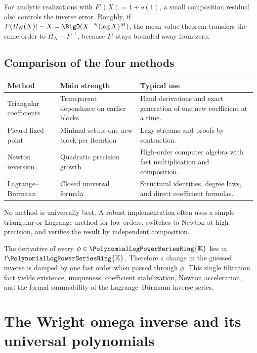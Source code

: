 \documentclass[11pt,oneside,openany]{book}
\newcommand{\K}{\mathbb{K}}
\newcommand{\Rring}{\PolynomialLogPowerSeriesRing{\K}}
\begin{document}
For analytic realizations with \(F'(X)=1+o(1)\), a small composition residual
also controls the inverse error.  Roughly, if
\(F(H_N(X))-X=\BigO(X^{-N}(\log X)^M)\), the mean value theorem transfers the
same order to \(H_N-F^{-1}\), because \(F'\) stays bounded away from zero.

\section{Comparison of the four methods}
\begin{center}
\begin{tabularx}{0.95\textwidth}{@{}>{\raggedright\arraybackslash}p{}>{\raggedright\arraybackslash}p{}X@{}}
\toprule
Method & Main strength & Typical use \\
\midrule
Triangular coefficients
& Transparent dependence on earlier blocks
& Hand derivations and exact generation of one new coefficient at a time. \\
Picard fixed point
& Minimal setup; one new block per iteration
& Lazy streams and proofs by contraction. \\
Newton reversion
& Quadratic precision growth
& High-order computer algebra with fast multiplication and composition. \\
Lagrange--Bürmann
& Closed universal formula
& Structural identities, degree laws, and direct coefficient formulas. \\
\bottomrule
\end{tabularx}
\end{center}

No method is universally best.  A robust implementation often uses a simple
triangular or Lagrange method for low orders, switches to Newton at high
precision, and verifies the result by independent composition.

\begin{summarybox}
The derivative of every \(\phi\in\Rring\) lies in \(t\Rring\).  Therefore a
change in the guessed inverse is damped by one fast order when passed through
\(\phi\).  This single filtration fact yields existence, uniqueness,
coefficient stabilization, Newton acceleration, and the formal summability of
the Lagrange--Bürmann inverse series.
\end{summarybox}


\chapter{The Wright omega inverse and its universal polynomials}
\label{ch:omega}
\end{document}
